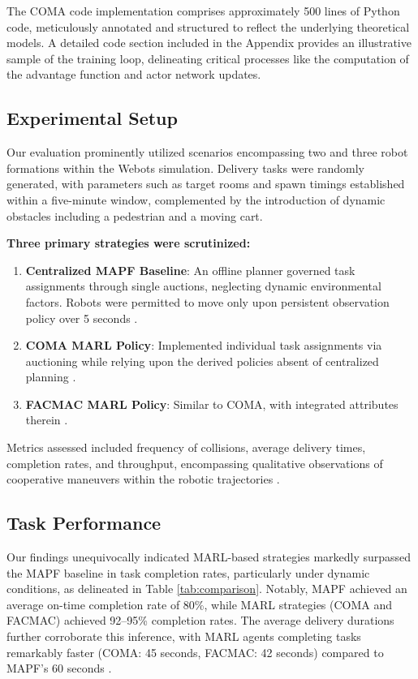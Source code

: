 \documentclass[conference]{IEEEtran}
\begin{document}
The COMA code implementation comprises approximately 500 lines of Python code, meticulously annotated and structured to reflect the underlying theoretical models. A detailed code section included in the Appendix provides an illustrative sample of the training loop, delineating critical processes like the computation of the advantage function and actor network updates.

\subsection{Experimental Setup}
Our evaluation prominently utilized scenarios encompassing two and three robot formations within the Webots simulation. Delivery tasks were randomly generated, with parameters such as target rooms and spawn timings established within a five-minute window, complemented by the introduction of dynamic obstacles including a pedestrian and a moving cart.





\textbf{Three primary strategies were scrutinized:}
\begin{enumerate}
    \item \textbf{Centralized MAPF Baseline}: An offline planner governed task assignments through single auctions, neglecting dynamic environmental factors. Robots were permitted to move only upon persistent observation policy over 5 seconds \citep{yang2022}.
    \item \textbf{COMA MARL Policy}: Implemented individual task assignments via auctioning while relying upon the derived policies absent of centralized planning \citep{wang2023a}.
    \item \textbf{FACMAC MARL Policy}: Similar to COMA, with integrated attributes therein \citep{wang2023a}.
\end{enumerate}

Metrics assessed included frequency of collisions, average delivery times, completion rates, and throughput, encompassing qualitative observations of cooperative maneuvers within the robotic trajectories \citep{salinas2023}.

\subsection{Task Performance}
Our findings unequivocally indicated MARL-based strategies markedly surpassed the MAPF baseline in task completion rates, particularly under dynamic conditions, as delineated in Table \ref{tab:comparison}. Notably, MAPF achieved an average on-time completion rate of 80\%, while MARL strategies (COMA and FACMAC) achieved 92--95\% completion rates. The average delivery durations further corroborate this inference, with MARL agents completing tasks remarkably faster (COMA: 45 seconds, FACMAC: 42 seconds) compared to MAPF’s 60 seconds \citep{salinas2023}.
\end{document}
